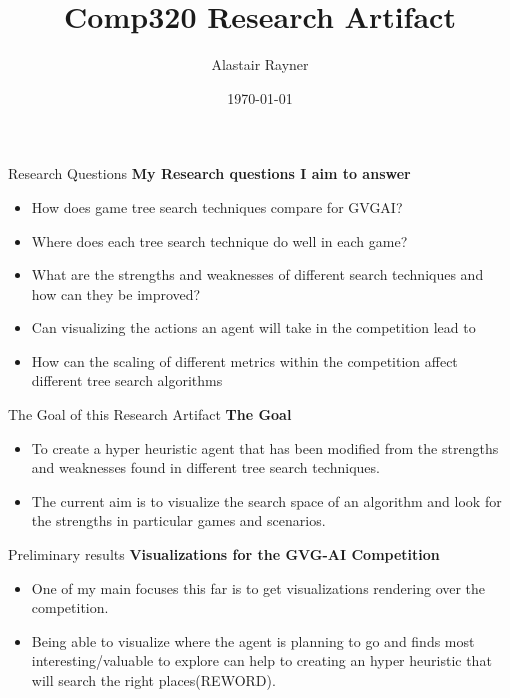 \documentclass{beamer}
\title{Comp320 Research Artifact}
\author{Alastair Rayner}
\date{\today}
\begin{document}
\maketitle


\begin{frame}{Research Questions}
	\textbf{My Research questions I aim to answer}
	
	\begin{itemize}
    		\item How does game tree search techniques compare for GVGAI? \pause
    		\item Where does each tree search technique do well in each game? \pause 
    		\item What are the strengths and weaknesses of different search techniques and how can they be improved? \pause
	\end{itemize}
	
	\begin{itemize}
		\item Can visualizing the actions an agent will take in the competition lead to  \pause
		\item How can the scaling of different metrics within the competition affect different tree search algorithms \pause
	\end{itemize}
\end{frame}



\begin{frame}{The Goal of this Research Artifact}
		\textbf{The Goal} \pause
		\begin{itemize}
			\item To create a hyper heuristic agent that has been modified from the strengths and weaknesses found in different tree search techniques. \pause
			\item The current aim is to visualize the search space of an algorithm and look for the strengths in particular games and scenarios. \pause
		\end{itemize}
\end{frame}


\begin{frame}{Preliminary results}
\textbf{Visualizations for the GVG-AI Competition} \pause
		\begin{itemize}
			\item One of my main focuses this far is to get visualizations rendering over the competition. \pause
			\item Being able to visualize where the agent is planning to go and finds most interesting/valuable to explore can help to creating an hyper heuristic that will search the right places(REWORD).
		\end{itemize}
\end{frame}
\end{document}
